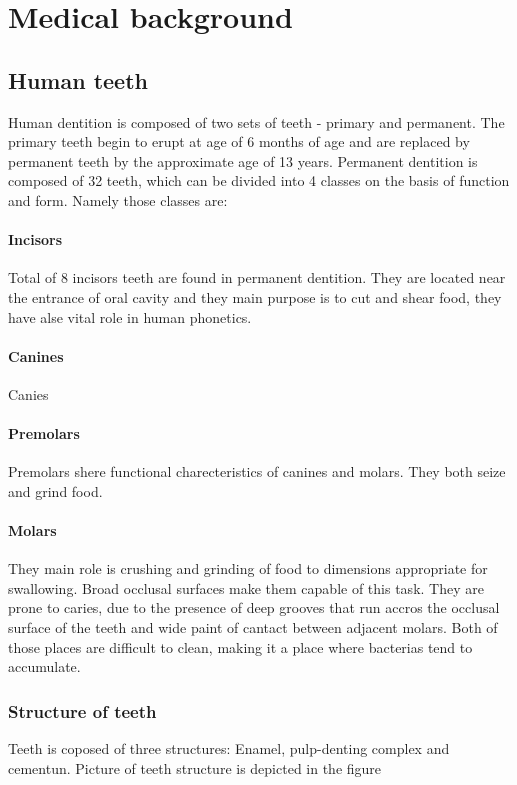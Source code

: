 \chapter{Medical background}

\section{Human teeth}
Human dentition is composed of two sets of teeth - primary and permanent. The primary teeth begin to erupt at age of 6 months of age and are replaced by permanent teeth by the approximate age of 13 years. Permanent dentition is composed of 32 teeth, which can be divided into 4 classes on the basis of function and form. Namely those classes are:

\subsubsection*{Incisors}
Total of 8 incisors teeth are found in permanent dentition. They are located near the entrance of oral cavity and they main purpose is to cut and shear food, they have alse vital role in human phonetics.

\subsubsection*{Canines}
Canies

\subsubsection*{Premolars}
Premolars shere functional charecteristics of canines and molars. They both seize and grind food.

\subsubsection*{Molars}
They main role is  crushing and grinding of food to dimensions appropriate for swallowing. Broad occlusal surfaces make them capable of this task. They are prone to caries, due to the presence of deep grooves that run accros the occlusal surface of the teeth and wide paint of cantact between adjacent molars. Both of those places are difficult to clean, making it a place where bacterias tend to accumulate.


\subsection{Structure of teeth}
Teeth is coposed of three structures: Enamel, pulp-denting complex and cementun. Picture of teeth structure is depicted in the figure

